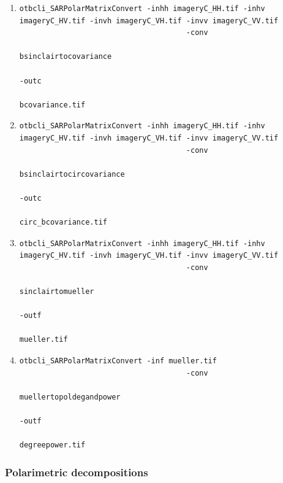 \begin{enumerate}
\item 
\begin{verbatim} 
otbcli_SARPolarMatrixConvert -inhh imageryC_HH.tif -inhv imageryC_HV.tif -invh imageryC_VH.tif -invv imageryC_VV.tif 
									  -conv
                                                                          bsinclairtocovariance
                                                                          -outc
                                                                          bcovariance.tif 
\end{verbatim}
									  
\item 
\begin{verbatim} 
otbcli_SARPolarMatrixConvert -inhh imageryC_HH.tif -inhv imageryC_HV.tif -invh imageryC_VH.tif -invv imageryC_VV.tif
									  -conv
                                                                          bsinclairtocircovariance
                                                                          -outc
                                                                          circ_bcovariance.tif 
\end{verbatim}
									  
									  
\item 
\begin{verbatim} 
otbcli_SARPolarMatrixConvert -inhh imageryC_HH.tif -inhv imageryC_HV.tif -invh imageryC_VH.tif -invv imageryC_VV.tif 
									  -conv
                                                                          sinclairtomueller
                                                                          -outf
                                                                          mueller.tif 
\end{verbatim}
									  
\item 
\begin{verbatim} 
otbcli_SARPolarMatrixConvert -inf mueller.tif 
									  -conv
                                                                          muellertopoldegandpower
                                                                          -outf
                                                                          degreepower.tif 
\end{verbatim}
									  
\end{enumerate}

\subsubsection{Polarimetric decompositions}

